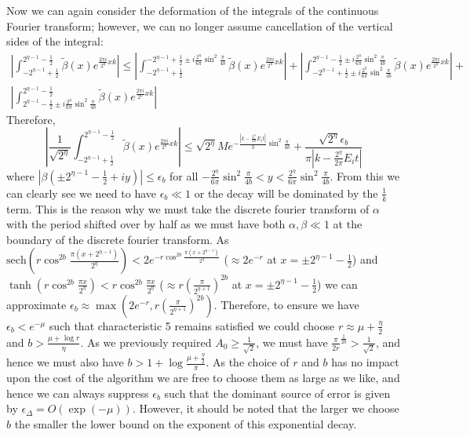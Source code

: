 \documentclass[aps,floatfix,10pt,amssymb,amsfont,amsmath,superscriptaddress,float,nofootinbib,longbibliography,nobalancelastpage,twocolumn]{revtex4-2}
\begin{document}
Now we can again consider the deformation of the integrals of the continuous Fourier transform; however, we can no longer assume cancellation of the vertical sides of the integral:
\begin{multline}
     \left|\int_{-2^{\eta-1}+\frac{1}{2}}^{2^{\eta-1}-\frac{1}{2}}\tilde\beta(x)e^{\frac{2\pi i}{2^{\eta}}xk}\right| \leq \left|\int_{-2^{\eta-1}+\frac{1}{2}}^{-2^{\eta-1}+\frac{1}{2}\pm i\frac{2^{\eta}}{6\pi}\sin^2\frac{\pi}{4b}}\tilde\beta(x)e^{\frac{2\pi i}{2^{\eta}}xk}\right|+\left|\int_{-2^{\eta-1}+\frac{1}{2}\pm i\frac{2^{\eta}}{6\pi}\sin^2\frac{\pi}{4b}}^{2^{\eta-1}-\frac{1}{2}\pm i\frac{2^{\eta}}{6\pi}\sin^2\frac{\pi}{4b}}\tilde\beta(x)e^{\frac{2\pi i}{2^{\eta}}xk}\right|+\\\left|\int_{2^{\eta-1}-\frac{1}{2}\pm i \frac{2^{\eta}}{6\pi}\sin^2\frac{\pi}{4b}}^{2^{\eta-1}-\frac{1}{2}}\tilde\beta(x)e^{\frac{2\pi i}{2^{\eta}}xk}\right|
\end{multline}
Therefore,
\begin{equation}
    \left|\frac{1}{\sqrt{2^{\eta}}}\int_{-2^{\eta-1}+\frac{1}{2}}^{2^{\eta-1}-\frac{1}{2}}\tilde\beta(x)e^{\frac{2\pi i}{2^{\eta}}xk}\right| \leq \sqrt{2^{\eta}}Me^{-\frac{|k-\frac{2^{\eta}}{2\pi}E_i t|}{3}\sin^2 \frac{\pi}{4b}} + \frac{\sqrt{2^{\eta}}\epsilon_b}{\pi|k-\frac{2^{\eta}}{2\pi}E_i t|}
\end{equation}
where $|\beta(\pm2^{\eta-1}-\frac{1}{2}+iy)| \leq\epsilon_b$ for all $-\frac{2^{\eta}}{6\pi}\sin^2\frac{\pi}{4b}<y<\frac{2^{\eta}}{6\pi}\sin^2\frac{\pi}{4b}$. From this we can clearly see we need to have $\epsilon_b \ll 1$ or the decay will be dominated by the $\frac{1}{k}$ term. This is the reason why we must take the discrete fourier transform of $\alpha$ with the period shifted over by half as we must have both $\alpha, \beta \ll 1$ at the boundary of the discrete fourier transform. As $\text{sech}( r\cos^{2b} \frac{\pi (x+2^{\eta-1})}{2^{\eta}})< 2e^{-r\cos^{2b} \frac{\pi (x+2^{\eta-1})}{2^{\eta}}}$ ($\approx 2e^{-r}$ at $x=\pm2^{\eta-1}-\frac{1}{2}$) and $\tanh (r\cos^{2b} \frac{\pi x}{2^{\eta}}) < r\cos^{2b} \frac{\pi x}{2^{\eta}}$ ($\approx r (\frac{\pi}{2^{\eta+1}})^{2b}$ at $x=\pm2^{\eta-1}-\frac{1}{2}$) we can approximate $\epsilon_b \approx \max(2e^{-r},r (\frac{\pi}{2^{\eta+1}})^{2b})$. Therefore, to ensure we have $\epsilon_b < e^{-\mu}$ such that characteristic 5 remains satisfied we could choose $r\approx \mu+\frac{\eta}{2}$ and $b > \frac{\mu+\log r}{\eta}$. As we previously required $A_0 \geq \frac{1}{\sqrt{2}}$, we must have $\frac{\pi}{2r}^{\frac{1}{2b}} > \frac{1}{\sqrt{2}}$, and hence we must also have $b > 1 + \log \frac{\mu + \frac{\eta}{2}}{\pi}$. As the choice of $r$ and $b$ has no impact upon the cost of the algorithm we are free to choose them as large as we like, and hence we can always suppress $\epsilon_b$ such that the dominant source of error is given by $\epsilon_{\Delta} = O(\exp(-\mu))$. However, it should be noted that the larger we choose $b$ the smaller the lower bound on the exponent of this exponential decay.
\end{document}
